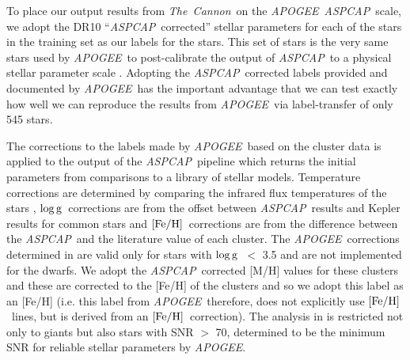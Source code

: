 \documentclass[12pt, preprint]{aastex}
\newcommand{\feh}{\mbox{$\rm [Fe/H]$}}
\newcommand{\logg}{\mbox{$\rm \log g$}}
\newcommand{\tc}{\textsl{The~Cannon}}
\newcommand{\apogee}{\textsl{APOGEE}}
\newcommand{\aspcap}{\textsl{ASPCAP}}
\begin{document}

To place our output results from \tc\ on the \apogee\ \aspcap\ scale, we adopt the DR10 ``\aspcap\ corrected'' stellar parameters for each of the stars in the training set as our labels for the stars. This set of stars is the very same stars used by \apogee\ to  post-calibrate the output of \aspcap\ to a physical stellar parameter scale \citep{Meszaros2013}. Adopting the \aspcap\ corrected labels provided and documented by \apogee\  has the important advantage that we can test exactly how well we can reproduce the results from \apogee\ via label-transfer of only 545 stars.

The corrections to the labels made by \apogee\ based on the cluster data is applied to the output of the \aspcap\ pipeline which returns the initial parameters from comparisons to a library of stellar models. Temperature corrections are determined by comparing the infrared flux temperatures of the stars \citep{Gonzalez2009}, \logg\ corrections are from the offset between \aspcap\ results and Kepler results for common stars and \feh\ corrections are from the difference between the \aspcap\ and  the literature value of each cluster.  The \apogee\ corrections determined in \citet{Meszaros2013} are valid only for stars with \logg\ $<$ 3.5 and are not implemented for the dwarfs.  We adopt the \aspcap\ corrected [M/H] values for these clusters and these are corrected to the [Fe/H] of the clusters and so we adopt this label as an [Fe/H] (i.e. this label from \apogee\ therefore, does not explicitly use \feh\ lines, but is derived from an \feh\ correction). The analysis in \citet{Meszaros2013} is restricted not only to giants but also stars with SNR $>$ 70, determined to be the minimum SNR for reliable stellar parameters by \apogee.
\end{document}
